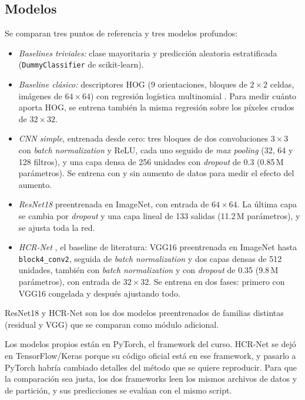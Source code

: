 \documentclass[conference]{IEEEtran}
\begin{document}
\subsection{Modelos}
Se comparan tres puntos de referencia y tres modelos profundos:
\begin{itemize}
  \item \textit{Baselines triviales:} clase mayoritaria y predicción
  aleatoria estratificada (\texttt{DummyClassifier} de scikit-learn).
  \item \textit{Baseline clásico:} descriptores HOG \cite{dalal_hog_2005}
  (9 orientaciones, bloques de $2\times2$ celdas, imágenes de $64\times64$)
  con regresión logística multinomial \cite{pedregosa_sklearn_2011}. Para
  medir cuánto aporta HOG, se entrena también la misma regresión sobre los
  píxeles crudos de $32\times32$.
  \item \textit{CNN simple}, entrenada desde cero: tres bloques de dos
  convoluciones $3\times3$ con \textit{batch normalization} y ReLU, cada uno
  seguido de \textit{max pooling} (32, 64 y 128 filtros), y una capa densa de
  256 unidades con \textit{dropout} de 0.3 (0.85\,M parámetros). Se entrena
  con y sin aumento de datos para medir el efecto del aumento.
  \item \textit{ResNet18} \cite{he_resnet_2016} preentrenada en ImageNet, con
  entrada de $64\times64$. La última capa se cambia por \textit{dropout} y una
  capa lineal de 133 salidas (11.2\,M parámetros), y se ajusta toda la red.
  \item \textit{HCR-Net} \cite{hcrnet_2024}, el baseline de literatura: VGG16
  preentrenada en ImageNet hasta \texttt{block4\_conv2}, seguida de
  \textit{batch normalization} y dos capas densas de 512 unidades, también
  con \textit{batch normalization} y con \textit{dropout} de 0.35 (9.8\,M
  parámetros), con entrada de $32\times32$. Se entrena en dos fases: primero
  con VGG16 congelada y después ajustando todo.
\end{itemize}
ResNet18 y HCR-Net son los dos modelos preentrenados de familias distintas
(residual y VGG) que se comparan como módulo adicional.

Los modelos propios están en PyTorch, el framework del curso. HCR-Net se dejó
en TensorFlow/Keras porque su código oficial está en ese framework, y pasarlo
a PyTorch habría cambiado detalles del método que se quiere reproducir. Para
que la comparación sea justa, los dos frameworks leen los mismos archivos de
datos y de partición, y sus predicciones se evalúan con el mismo script.
\end{document}
